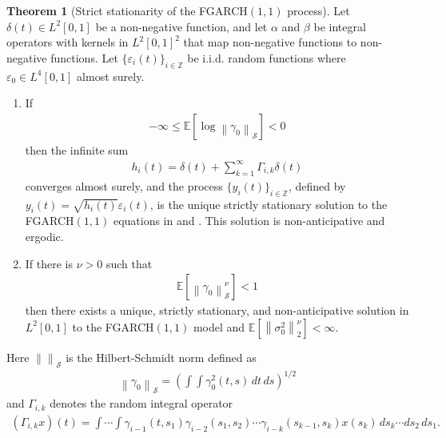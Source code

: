 \documentclass[12pt,a4paper]{article}
\theoremstyle{definition}
\newtheorem{theorem}{Theorem}[section]
\begin{document}
\begin{theorem}[Strict stationarity of the FGARCH$(1,1)$ process]
\label{StationarityFGARCH11}
    Let $\delta(t)\in L^2[0,1]$ be a non-negative function, and let $\alpha$ and $\beta$ be integral operators with kernels in $L^2[0,1]^2$ that map non-negative functions to non-negative functions. Let $\{\varepsilon_i(t)\}_{i\in \mathbb{Z}}$ be i.i.d. random functions where $\varepsilon_0\in L^{4}[0,1]$ almost surely.
    \begin{enumerate}[label=(\roman*)]
        \item
        \label{FGARCHStationarySolution}
        If
            \begin{gather}
            \label{FGARCH11StationaryCondition}
                 -\infty \leq \mathbb{E}\left[\log \left\| \gamma_0 \right\|_\mathcal{S}\right] < 0
            \end{gather}
            then the infinite sum
            \begin{gather}
            \label{FGARCH11StationarySolution}
                h_i(t)=\delta(t)+\sum_{k=1}^\infty \Gamma_{i,k}\delta(t)
            \end{gather}
            converges almost surely, and the process $\{y_i(t)\}_{i\in\mathbb{Z}}$, defined by $y_i(t)=\sqrt{h_i(t)}\varepsilon_i(t)$, is the unique strictly stationary solution to the FGARCH$(1,1)$ equations in  and . This solution is non-anticipative and ergodic.
        \item
        \label{FGARCHMoments}
        If there is $\nu>0$ such that 
        \begin{gather}
        \label{FGARCH11StationarityMomentsCondition}
            \mathbb{E}\left[\left\| \gamma_0 \right\|_\mathcal{S}^\nu\right] < 1
        \end{gather}
        then there exists a unique, strictly stationary, and non-anticipative solution in $L^2[0,1]$ to the FGARCH$(1,1)$ model and $\mathbb{E}\left[\left\| \sigma_0^2 \right\|_2^\nu\right] < \infty$.
    \end{enumerate}
\end{theorem}
Here $\left\|\right\|_\mathcal{S}$ is the Hilbert-Schmidt norm defined as
\begin{gather}
    \left\| \gamma_0 \right\|_\mathcal{S}=\left(\int\!\!\int \gamma_0^2(t,s)\,dt\,ds\right)^{1/2}
\end{gather}
and $\Gamma_{i,k}$ denotes the random integral operator
\begin{gather}
\label{OperatorStationarySolution}
    (\Gamma_{i,k}x)(t)=\int \cdots \int\gamma_{i-1}(t,s_1)\gamma_{i-2}(s_1,s_2)\cdots\gamma_{i-k}(s_{k-1},s_k)x(s_k)\,ds_k\cdots ds_2\,ds_1.
\end{gather}
\end{document}
